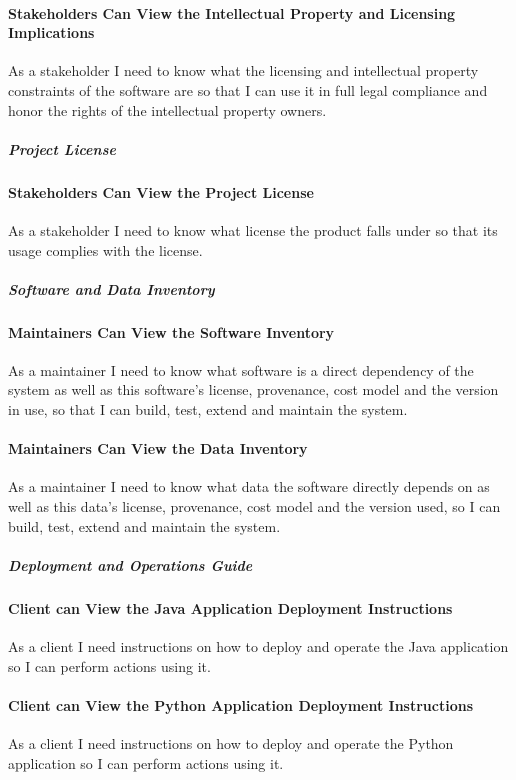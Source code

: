 \paragraph{Stakeholders Can View the Intellectual Property and Licensing Implications}
As a stakeholder I need to know what the licensing and intellectual property constraints of the software are so that I can use it in full legal compliance and honor the rights of the intellectual property owners.

\subparagraph{Project License}

\paragraph{Stakeholders Can View the Project License}
As a stakeholder I need to know what license the product falls under so that its usage complies with the license.

\subparagraph{Software and Data Inventory}

\paragraph{Maintainers Can View the Software Inventory}
As a maintainer I need to know what software is a direct dependency of the system as well as this software's license, provenance, cost model and the version in use, so that I can build, test, extend and maintain the system.

\paragraph{Maintainers Can View the Data Inventory}
As a maintainer I need to know what data the software directly depends on as well as this data's license, provenance, cost model and the version used, so I can build, test, extend and maintain the system.

\subparagraph{Deployment and Operations Guide}

\paragraph{Client can View the Java Application Deployment Instructions}
As a client I need instructions on how to deploy and operate the Java application so I can perform actions using it.

\paragraph{Client can View the Python Application Deployment Instructions}
As a client I need instructions on how to deploy and operate the Python application so I can perform actions using it.

